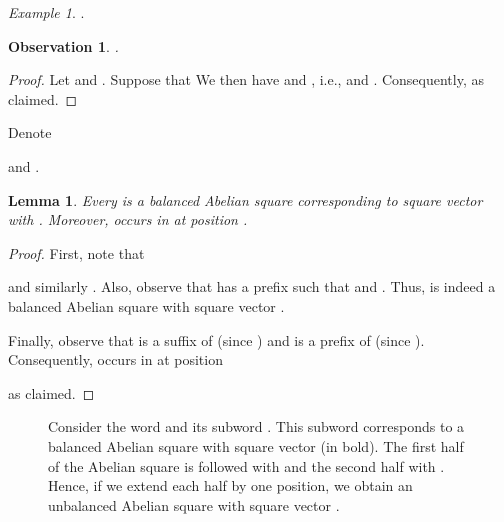 \documentclass{article}
\theoremstyle{plain}
\newtheorem{lemma}[theorem]{Lemma}
\newtheorem{observation}[theorem]{Observation}
\theoremstyle{definition}
\theoremstyle{remark}
\newtheorem{example}[theorem]{Example}
\begin{document}
  \begin{example}
    .
  \end{example}
  
  \begin{observation}\label{obs:S}
    .
  \end{observation}
  \begin{proof}
    Let  and .
    Suppose that 
    We then have  and
    , i.e.,  and .
    Consequently, 
    as claimed. 
  \end{proof}

  \noindent
  Denote
  
  and .
  
  \begin{lemma}\label{lem:balanced}
  Every  is a balanced Abelian square corresponding to square vector  with .
  Moreover,  occurs in  at position .
  \end{lemma}
  \begin{proof}
  First, note that 
  
  and similarly . Also,
  observe that  has a prefix
   such
  that  and . Thus,
   is indeed a balanced Abelian square with square vector .
  
  Finally, observe that  is a suffix of  (since )
  and  is a prefix of  (since ).
  Consequently,  occurs in  at position
  
  as claimed.
  \end{proof}
   

  \begin{figure}[b]
    \centering
     \caption{
      Consider the word  and its subword .
      This subword corresponds to a balanced Abelian square with square vector
       (in bold).
      The first half of the Abelian square is followed with  and the second half with .
      Hence, if we extend each half by one position, we obtain an unbalanced Abelian square
      with square vector .
    }\label{fig:lb}
  \end{figure}
\end{document}

